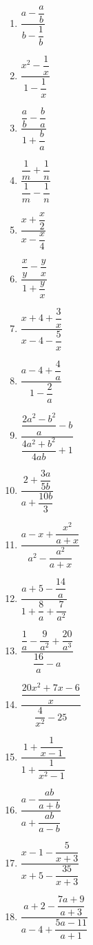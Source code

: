 \documentclass{article}
\begin{document}
\begin{enumerate}[label=\bfseries\small 137.\arabic*, itemsep=2.5cm]
\large

\item $\dfrac{a - \dfrac{a}{b}}{b - \dfrac{1}{b}}$

\item $\dfrac{x^2 - \dfrac{1}{x}}{1 - \dfrac{1}{x}}$

\item $\dfrac{\dfrac{a}{b} - \dfrac{b}{a}}{1 + \dfrac{b}{a}}$

\item $\dfrac{\dfrac{1}{m} + \dfrac{1}{n}}{\dfrac{1}{m} - \dfrac{1}{n}}$

\item $\dfrac{x + \dfrac{x}{2}}{x- \dfrac{x}{4}}$

\item $\dfrac{\dfrac{x}{y} - \dfrac{y}{x}}{1 + \dfrac{y}{x}}$

\item $\dfrac{x + 4 + \dfrac{3}{x}}{x - 4 - \dfrac{5}{x}}$

\item $\dfrac{a - 4 + \dfrac{4}{a}}{1 - \dfrac{2}{a}}$ 

\item $\dfrac{\dfrac{2a^2 - b^2}{a} - b}{\dfrac{4a^2 + b^2}{4ab} + 1}$

\item $\dfrac{2 + \dfrac{3a}{5b}}{a + \dfrac{10b}{3}}$

\item $\dfrac{a - x + \dfrac{x^2}{a + x}}{a^2 - \dfrac{a^2}{a + x}}$

\item $\dfrac{a + 5 - \dfrac{14}{a}}{1 + \dfrac{8}{a} + \dfrac{7}{a^2}}$

\item $\dfrac{\dfrac{1}{a} - \dfrac{9}{a^2} + \dfrac{20}{a^3}} {\dfrac{16}{a} - a}$
      

\item $\dfrac{\dfrac{20x^2 + 7x - 6}{x}}{\dfrac{4}{x^2} - 25}$

\item $\dfrac{1 + \dfrac{1}{x - 1}}{1 + \dfrac{1}{x^2 - 1}}$

\item $\dfrac{a - \dfrac{ab}{a + b}}{a + \dfrac{ab}{a - b}}$

\item $\dfrac{x - 1 - \dfrac{5}{x + 3}}{x + 5 - \dfrac{35}{x + 3}}$

\item $\dfrac{a + 2 - \dfrac{7a + 9}{a + 3}}{a - 4 + \dfrac{5a - 11}{a + 1}}$

\end{enumerate}
\end{document}
